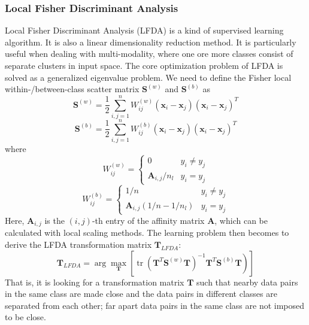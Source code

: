 \documentclass[conference]{IEEEtran}
\begin{document}
\subsubsection{Local Fisher Discriminant Analysis}
\par
Local Fisher Discriminant Analysis (LFDA) \cite{sugiyama2007dimensionality} is a kind of supervised learning algorithm. It is also a linear dimensionality reduction method. It is particularly useful when dealing with multi-modality, where one ore more classes consist of separate clusters in input space. The core optimization problem of LFDA is solved as a generalized eigenvalue problem.
We need to define the Fisher local within-/between-class scatter matrix $\mathbf{S}^{(w)}$ and $\mathbf{S}^{(b)}$ as
\begin{equation}
	\mathbf{S}^{(w)}=\frac{1}{2} \sum_{i, j=1}^{n} W_{i j}^{(w)}\left(\mathbf{x}_{i}-\mathbf{x}_{j}\right)\left(\mathbf{x}_{i}-\mathbf{x}_{j}\right)^{T}
\end{equation}
\begin{equation}
	\mathbf{S}^{(b)}=\frac{1}{2} \sum_{i, j=1}^{n} W_{i j}^{(b)}\left(\mathbf{x}_{i}-\mathbf{x}_{j}\right)\left(\mathbf{x}_{i}-\mathbf{x}_{j}\right)^{T}
\end{equation}
where
\begin{equation}
	W_{i j}^{(w)}=\left\{\begin{array}{rl}
		0 & y_{i} \neq y_{j} \\
		\mathbf{A}_{i, j} / n_{l} & y_{i}=y_{j}
		\end{array}\right.
\end{equation}
\begin{equation}
	W_{i j}^{(b)}=\left\{\begin{array}{rl}
		1 / n & y_{i} \neq y_{j} \\
		\mathbf{A}_{i, j}\left(1 / n-1 / n_{l}\right) & y_{i}=y_{j}
		\end{array}\right.
\end{equation}
Here, $\mathbf{A}_{i,j}$ is the $(i,j)$-th entry of the affinity matrix $\mathbf{A}$, which can be calculated with local scaling methods. The learning problem then becomes to derive the LFDA transformation matrix $\mathbf{T}_{LFDA}$:
\begin{equation}
	\left.\mathbf{T}_{L F D A}=\arg \max _{\mathbf{T}}\left[\operatorname{tr}\left(\mathbf{T}^{T} \mathbf{S}^{(w)} \mathbf{T}\right)^{-1} \mathbf{T}^{T} \mathbf{S}^{(b)} \mathbf{T}\right)\right]
\end{equation}
That is, it is looking for a transformation matrix $\mathbf{T}$ such that nearby data pairs in the same class are made close and the data pairs in different classes are separated from each other; far apart data pairs in the same class are not imposed to be close.
\end{document}

